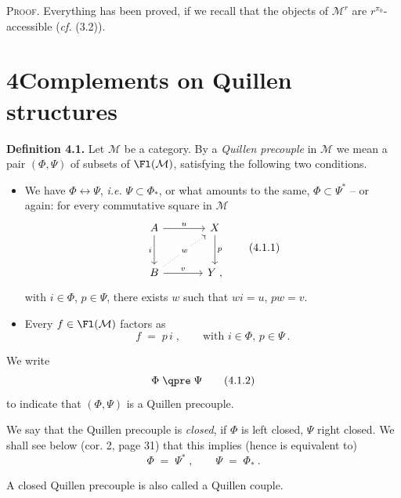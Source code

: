 
\textsc{Proof}. Everything has been proved, if we recall that the objects of $\mathcal{M}^r$ are $r^{\pi_0}$-accessible (\textit{cf.} (3.2)).

\section*{4\quad Complements on Quillen structures}

\textbf{Definition 4.1.} Let $\mathcal{M}$ be a category. By a \textit{Quillen precouple} in $\mathcal{M}$ we mean a pair $(\Phi,\Psi)$ of subsets of $\Fl(\mathcal{M})$, satisfying the following two conditions.
\begin{itemize}[leftmargin=2.5em]
\item[\textit{a})] We have $\Phi\longleftrightarrow\Psi$, \textit{i.e.} $\Psi\subset\Phi_*$, or what amounts to the same, $\Phi\subset\Psi^*$ -- or again: for every commutative square in $\mathcal{M}$
\[
\begin{tikzcd}[row sep=large, column sep=large]
A \arrow[r, "u"] \arrow[d, "i"'] & X \arrow[d, "p"] \\
B \arrow[ur, dotted, "w" description] \arrow[r, "v"] & Y \;,
\end{tikzcd}
\tag*{(4.1.1)}
\]
with $i\in\Phi$, $p\in\Psi$, there exists $w$ such that $wi=u$, $pw=v$.
\item[\textit{b})] Every $f\in\Fl(\mathcal{M})$ factors as
\[
f \;=\; p\,i\;, \qquad \text{with } i\in\Phi,\, p\in\Psi\ .
\]
\end{itemize}
We write
\[
\Phi \;\qpre\; \Psi
\tag*{(4.1.2)}
\] %
to indicate that $(\Phi,\Psi)$ is a Quillen precouple.

We say that the Quillen precouple is \textit{closed}, if $\Phi$ is left closed, $\Psi$ right closed. We shall see below (cor. 2, page 31) that this implies (hence is equivalent to) %
\[
\Phi \;=\; \Psi^*\;, \qquad \Psi \;=\; \Phi_*\ .
\tag*{(4.1.3)}
\]

A closed Quillen precouple is also called a Quillen couple.

